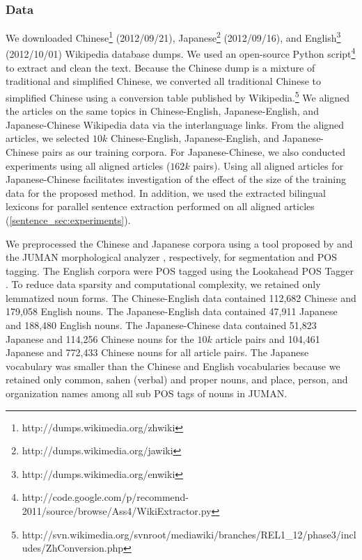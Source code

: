 \documentclass[english]{jnlp_1.4}
\begin{document}
\subsubsection{Data}
\label{lexicon_sec:data}

We downloaded Chinese\footnote{http://dumps.wikimedia.org/zhwiki}
(2012/09/21), Japanese\footnote{http://dumps.wikimedia.org/jawiki}
(2012/09/16), and English\footnote{http://dumps.wikimedia.org/enwiki}
(2012/10/01) Wikipedia database dumps. We used an open-source Python
script\footnote{http://code.google.com/p/recommend-2011/source/browse/Ass4/WikiExtractor.py}
to extract and clean the text.
Because the Chinese dump is a mixture of traditional and simplified Chinese,
we converted all traditional Chinese to simplified Chinese using a
conversion table published by
Wikipedia.\footnote{http://svn.wikimedia.org/svnroot/mediawiki/branches/REL1\_12/phase3/includes/ZhConversion.php}
We aligned the articles on the same topics in Chinese-English,
Japanese-English, and Japanese-Chinese Wikipedia data via the interlanguage links. 
From the aligned articles, we selected $10k$ Chinese-English, Japanese-English, and Japanese-Chinese
pairs as our training corpora. For Japanese-Chinese, we also conducted experiments using all aligned articles
($162k$ pairs). Using all aligned articles for Japanese-Chinese facilitates investigation of the effect of the size of the training 
data for the proposed method. In addition, we used the extracted bilingual lexicons for parallel sentence extraction 
performed on all aligned articles (\ref{sentence_sec:experiments}).

We preprocessed the Chinese and Japanese corpora using a tool proposed by 
and the JUMAN morphological analyzer \cite{kurohashi--EtAl:1994}, respectively, for segmentation 
and POS tagging. The English corpora were POS tagged using the Lookahead POS Tagger \cite{tsuruoka-miyao-kazama:2011:CoNLL}. 
To reduce data sparsity and computational complexity, we retained only lemmatized noun forms. 
The Chinese-English data contained 112,682 Chinese and 179,058 English nouns. The Japanese-English 
data contained 47,911 Japanese and 188,480 English nouns. The Japanese-Chinese data contained 51,823 
Japanese and 114,256 Chinese nouns for the $10k$ article pairs and 104,461 Japanese and 772,433 Chinese 
nouns for all article pairs. The Japanese vocabulary was smaller than the Chinese and English vocabularies 
because we retained only common, sahen (verbal) and proper nouns, and place, person, and organization 
names among all sub POS tags of nouns in JUMAN.
\end{document}
